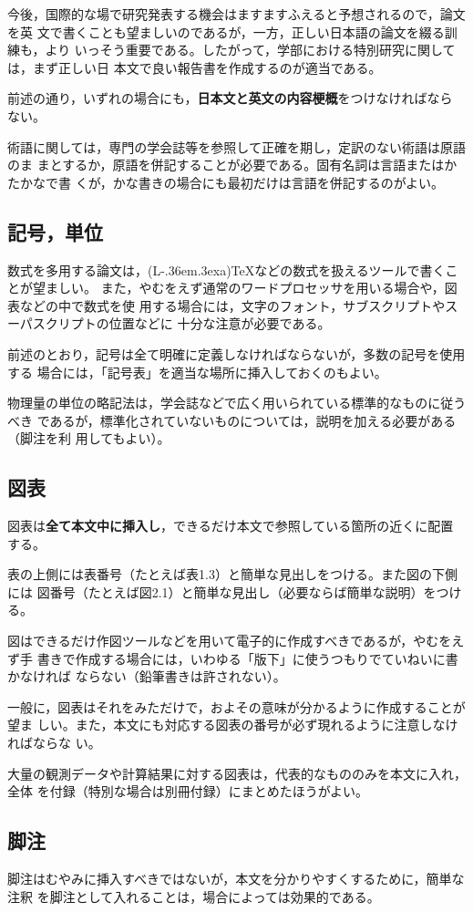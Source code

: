 \documentclass{kuisthesis}			%
\def\LATEX{{\rm (L\kern-.36em\raise.3ex\hbox{\sc a})\TeX}}
\let\EM\bf
\begin{document}
今後，国際的な場で研究発表する機会はますますふえると予想されるので，論文を英
文で書くことも望ましいのであるが，一方，正しい日本語の論文を綴る訓練も，より
いっそう重要である。したがって，学部における特別研究に関しては，まず正しい日
本文で良い報告書を作成するのが適当である。

前述の通り，いずれの場合にも，{\EM 日本文と英文の内容梗概}をつけなければなら
ない。

術語に関しては，専門の学会誌等を参照して正確を期し，定訳のない術語は原語のま
まとするか，原語を併記することが必要である。固有名詞は言語またはかたかなで書
くが，かな書きの場合にも最初だけは言語を併記するのがよい。

\subsection{記号，単位}\label{subsec-symbol}
数式を多用する論文は，\LATEX などの数式を扱えるツールで書くことが望ましい。
また，やむをえず通常のワードプロセッサを用いる場合や，図表などの中で数式を使
用する場合には，文字のフォント，サブスクリプトやスーパスクリプトの位置などに
十分な注意が必要である。

前述のとおり，記号は全て明確に定義しなければならないが，多数の記号を使用する
場合には，「記号表」を適当な場所に挿入しておくのもよい。

物理量の単位の略記法は，学会誌などで広く用いられている標準的なものに従うべき
であるが，標準化されていないものについては，説明を加える必要がある（脚注を利
用してもよい）。

\subsection{図表}\label{subsec-figure}
図表は{\EM 全て本文中に挿入し}，できるだけ本文で参照している箇所の近くに配置
する。

表の上側には表番号（たとえば表1.3）と簡単な見出しをつける。また図の下側には
図番号（たとえば図2.1）と簡単な見出し（必要ならば簡単な説明）をつける。

図はできるだけ作図ツールなどを用いて電子的に作成すべきであるが，やむをえず手
書きで作成する場合には，いわゆる「版下」に使うつもりでていねいに書かなければ
ならない（鉛筆書きは許されない）。

一般に，図表はそれをみただけで，およその意味が分かるように作成することが望ま
しい。また，本文にも対応する図表の番号が必ず現れるように注意しなければならな
い。

大量の観測データや計算結果に対する図表は，代表的なもののみを本文に入れ，全体
を付録（特別な場合は別冊付録）にまとめたほうがよい。

\subsection{脚注}\label{subsec-footnote}
脚注はむやみに挿入すべきではないが，本文を分かりやすくするために，簡単な注釈
を脚注として入れることは，場合によっては効果的である。
\end{document}
